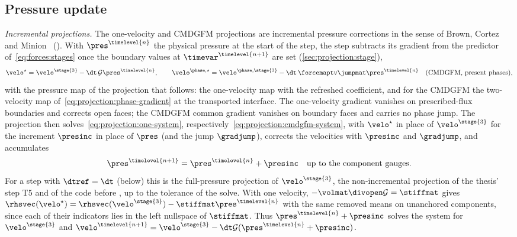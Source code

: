 \subsection{Pressure update}\label{sec:projection:pressure-update}
\emph{Incremental projections.} The one-velocity and CMDGFM projections are
incremental pressure corrections in the sense of Brown, Cortez and
Minion~\cite{brown2001} (). With $\pres^{\timelevel{n}}$ the
physical pressure at the start of the step, the step subtracts its gradient
from the predictor of~\cref{eq:forces:stages} once the boundary values at
$\timevar^{\timelevel{n+1}}$ are set (\cref{sec:projection:stage}),
\begin{equation}\label{eq:projection:pressure-predictor}
  \velo^{\star}=\velo^{\stage{3}}-\dt\,\mathcal G\pres^{\timelevel{n}},
  \qquad
  \velo^{\phase,\star}=\velo^{\phase,\stage{3}}-\dt\,\forcemaptv\jumpmat\pres^{\timelevel{n}}
  \quad(\text{CMDGFM, present phases}),
\end{equation}
with the pressure map of the projection that follows: the one-velocity map
with the refreshed coefficient, and for the CMDGFM the two-velocity map
of~\cref{eq:projection:phase-gradient} at the transported interface. The
one-velocity gradient vanishes on prescribed-flux boundaries and corrects
open faces; the CMDGFM common gradient vanishes on boundary faces and
carries no phase jump. The projection then
solves~\cref{eq:projection:one-system}, respectively~\cref{eq:projection:cmdgfm-system},
with $\velo^{\star}$ in place of $\velo^{\stage{3}}$ for the increment
$\presinc$ in place of $\pres$ (and the jump $\gradjump$), corrects the
velocities with $\presinc$ and $\gradjump$, and accumulates
\begin{equation}\label{eq:projection:pressure-increment}
  \pres^{\timelevel{n+1}}=\pres^{\timelevel{n}}+\presinc
  \quad\text{up to the component gauges}.
\end{equation}
For a step with $\dtref=\dt$ (below) this is the full-pressure projection of
$\velo^{\stage{3}}$, the non-incremental projection of the thesis' step T5 and
of the code before , up to the tolerance of the solve. With one
velocity, $-\volmat\divopen\mathcal G=\stiffmat$ gives
$\rhsvec(\velo^{\star})=\rhsvec(\velo^{\stage{3}})-\stiffmat\pres^{\timelevel{n}}$
with the same removed means on unanchored components, since each of their
indicators lies in the left nullspace of $\stiffmat$. Thus
$\pres^{\timelevel{n}}+\presinc$ solves the system for
$\velo^{\stage{3}}$ and
$\velo^{\timelevel{n+1}}=\velo^{\stage{3}}-\dt\mathcal G(\pres^{\timelevel{n}}+\presinc)$.
